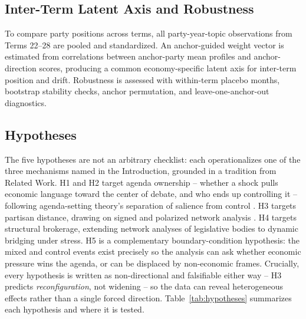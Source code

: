 \documentclass[11pt]{article}
\begin{document}
\subsection{Inter-Term Latent Axis and Robustness}
To compare party positions across terms, all party-year-topic observations from Terms 22--28 are pooled and standardized. An anchor-guided weight vector is estimated from correlations between anchor-party mean profiles and anchor-direction scores, producing a common economy-specific latent axis for inter-term position and drift. Robustness is assessed with within-term placebo months, bootstrap stability checks, anchor permutation, and leave-one-anchor-out diagnostics.

\subsection{Hypotheses}
The five hypotheses are not an arbitrary checklist: each operationalizes one of the three mechanisms named in the Introduction, grounded in a tradition from Related Work. H1 and H2 target agenda ownership -- whether a shock pulls economic language toward the center of debate, and who ends up controlling it -- following agenda-setting theory's separation of salience from control \cite{kleinnijenhuis1995}. H3 targets partisan distance, drawing on signed and polarized network analysis \cite{bonchi2019, blohm2026}. H4 targets structural brokerage, extending network analyses of legislative bodies \cite{porter2005} to dynamic bridging under stress. H5 is a complementary boundary-condition hypothesis: the mixed and control events exist precisely so the analysis can ask whether economic pressure wins the agenda, or can be displaced by non-economic frames. Crucially, every hypothesis is written as non-directional and falsifiable either way -- H3 predicts \emph{reconfiguration}, not widening -- so the data can reveal heterogeneous effects rather than a single forced direction. Table~\ref{tab:hypotheses} summarizes each hypothesis and where it is tested.
\end{document}
